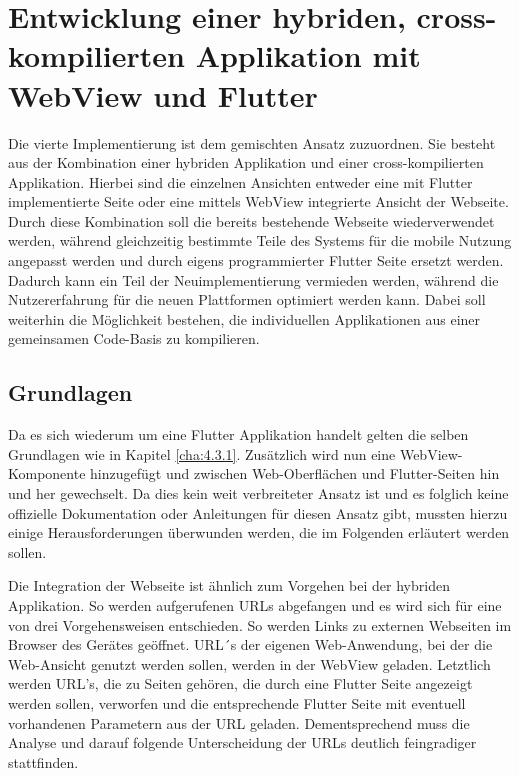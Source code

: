 \section{Entwicklung einer hybriden, cross-kompilierten Applikation mit WebView und Flutter}
Die vierte Implementierung ist dem gemischten Ansatz zuzuordnen. Sie besteht aus der Kombination einer hybriden Applikation und einer cross-kompilierten Applikation.
Hierbei sind die einzelnen Ansichten entweder eine mit Flutter implementierte Seite oder eine mittels WebView integrierte Ansicht der Webseite.
Durch diese Kombination soll die bereits bestehende Webseite wiederverwendet werden, während gleichzeitig bestimmte Teile des Systems für die mobile Nutzung angepasst werden und durch eigens programmierter Flutter Seite ersetzt werden.
Dadurch kann ein Teil der Neuimplementierung vermieden werden, während die Nutzererfahrung für die neuen Plattformen optimiert werden kann.
Dabei soll weiterhin die Möglichkeit bestehen, die individuellen Applikationen aus einer gemeinsamen Code-Basis zu kompilieren.

\subsection{Grundlagen}
Da es sich wiederum um eine Flutter Applikation handelt gelten die selben Grundlagen wie in Kapitel \ref{cha:4.3.1}.
Zusätzlich wird nun eine WebView-Komponente hinzugefügt und zwischen Web-Oberflächen und Flutter-Seiten hin und her gewechselt.
Da dies kein weit verbreiteter Ansatz ist und es folglich keine offizielle Dokumentation oder Anleitungen für diesen Ansatz gibt, mussten hierzu einige Herausforderungen überwunden werden, die im Folgenden erläutert werden sollen.

Die Integration der Webseite ist ähnlich zum Vorgehen bei der hybriden Applikation. So werden aufgerufenen URLs abgefangen und es wird sich für eine von drei Vorgehensweisen entschieden. So werden Links zu externen Webseiten im Browser des Gerätes geöffnet. URL´s der eigenen Web-Anwendung, bei der die Web-Ansicht genutzt werden sollen, werden in der WebView geladen. Letztlich werden URL's, die zu Seiten gehören, die durch eine Flutter Seite angezeigt werden sollen, verworfen und die entsprechende Flutter Seite mit eventuell vorhandenen Parametern aus der URL geladen. 
Dementsprechend muss die Analyse und darauf folgende Unterscheidung der URLs deutlich feingradiger stattfinden.

